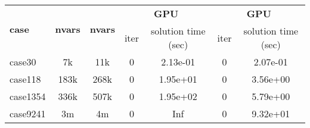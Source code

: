 \begin{tabular}{|l|c|c|cc|cc|}
\hline 
\multirow{2}{*}{\bf case} & \multirow{2}{*}{\bf nvars} & \multirow{2}{*}{\bf nvars} & \multicolumn{2}{c|}{\textbf{GPU}} & \multicolumn{2}{c|}{\textbf{GPU}} \\
\cline{4-7} &  &  & iter & solution time (sec) & iter & solution time (sec) \\
\hline 
case30 &   7k &  11k & 0 & 2.13e-01 & 0 & 2.07e-01 \\
case118 & 183k & 268k & 0 & 1.95e+01 & 0 & 3.56e+00 \\
case1354 & 336k & 507k & 0 & 1.95e+02 & 0 & 5.79e+00 \\
case9241 &   3m &   4m & 0 & Inf & 0 & 9.32e+01 \\
\hline 
\end{tabular}
